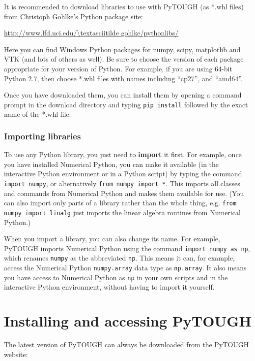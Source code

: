It is recommended to download libraries to use with PyTOUGH (as *.whl files) from Christoph Gohlke's Python package site:

\url{http://www.lfd.uci.edu/\textasciitilde gohlke/pythonlibs/}

Here you can find Windows Python packages for numpy, scipy, matplotlib and VTK (and lots of others as well). Be sure to choose the version of each package appropriate for your version of Python. For example, if you are using 64-bit Python 2.7, then choose *.whl files with names including ``cp27'', and ``amd64''.

Once you have downloaded them, you can install them by opening a command prompt in the download directory and typing \texttt{pip install} followed by the exact name of the *.whl file.

\subsubsection{Importing libraries}

To use any Python library, you just need to \textbf{import} it first.  For example, once you have installed Numerical Python, you can make it available (in the interactive Python environment or in a Python script) by typing the command \texttt{import numpy}, or alternatively \texttt{from numpy import *}.  This imports all classes and commands from Numerical Python and makes them available for use.  (You can also import only parts of a library rather than the whole thing, e.g. \texttt{from numpy import linalg} just imports the linear algebra routines from Numerical Python.)

When you import a library, you can also change its name.  For example, PyTOUGH imports Numerical Python using the command \texttt{import numpy as np}, which renames \texttt{numpy} as the abbreviated \texttt{np}.  This means it can, for example, access the Numerical Python \texttt{numpy.array} data type as \texttt{np.array}.  It also means you have access to Numerical Python as \texttt{np} in your own scripts and in the interactive Python environment, without having to import it yourself.

\section{Installing and accessing PyTOUGH}
\label{installing}

The latest version of PyTOUGH can always be downloaded from the PyTOUGH website:

